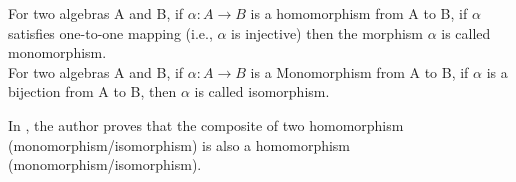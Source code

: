 For two algebras A and B, if \(\alpha : A \rightarrow B \)  is a homomorphism from A to B, if \(\alpha\) satisfies one-to-one mapping (i.e., \(\alpha\) is injective) then the morphism \(\alpha\) is called monomorphism. \\

For two algebras A and B, if \(\alpha : A \rightarrow B \)  is a Monomorphism from A to B, if \(\alpha\) is a bijection from A to B, then \(\alpha\) is called isomorphism.

In \cite{sankappanavar1981course}, the author proves that the composite of two homomorphism (monomorphism/isomorphism) is also a homomorphism (monomorphism/isomorphism).
